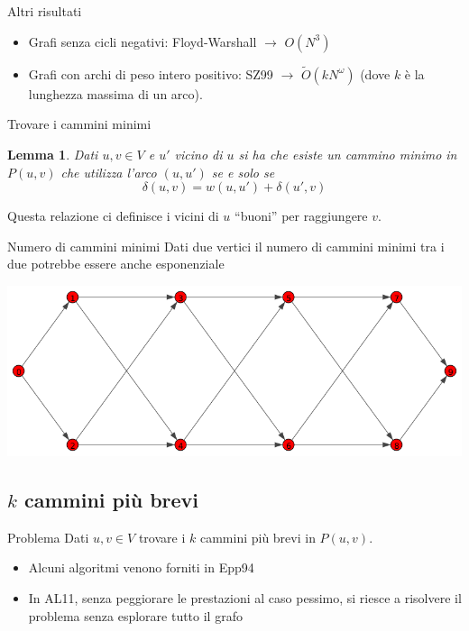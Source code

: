 \documentclass{beamer}
\newcounter{counter1}
\theoremstyle{plain}
\newtheorem{mylem}[counter1]{Lemma}
\theoremstyle{definition}
\theoremstyle{remark}
\newcommand{\pa}[1]{\left(#1\right)}
\begin{document}
\begin{frame}{Altri risultati}
  \begin{itemize}
  \item Grafi senza cicli negativi: Floyd-Warshall $\rightarrow$ $O \pa{N^3}$
  \item Grafi con archi di peso intero positivo: SZ99 $\rightarrow$
    $\tilde O \pa{k N^\omega}$ (dove $k$ \`e la lunghezza massima di
    un arco).
  \end{itemize}
\end{frame}

\begin{frame}{Trovare i cammini minimi}
  \begin{mylem}
    Dati $u,v \in V$ e $u'$ vicino di $u$ si ha che esiste un cammino
    minimo in $P(u,v)$ che utilizza l'arco $(u,u')$ se e solo se
    \[ \delta \pa{ u,v} = w\pa{ u,u' } + \delta \pa{ u',v} \]
  \end{mylem}
  \vfill
  
  Questa relazione ci definisce i vicini di $u$ ``buoni'' per
  raggiungere $v$.
\end{frame}

\begin{frame}{Numero di cammini minimi}
  Dati due vertici il numero di cammini minimi tra i due potrebbe
  essere anche esponenziale
  \vfill
  
  \includegraphics[width=\textwidth]{diamantecatena}
\end{frame}


\subsection{$k$ cammini pi\`u brevi}

\begin{frame}
  \begin{block}{Problema}
    Dati $u,v \in V$ trovare i $k$ cammini pi\`u brevi in $P(u,v)$.
  \end{block}
  \vfill
  
  \begin{itemize}
  \item Alcuni algoritmi venono forniti in Epp94
  \item In AL11, senza peggiorare le prestazioni al caso pessimo, si
    riesce a risolvere il problema senza esplorare tutto il grafo
  \end{itemize}
  
\end{frame}
\end{document}
